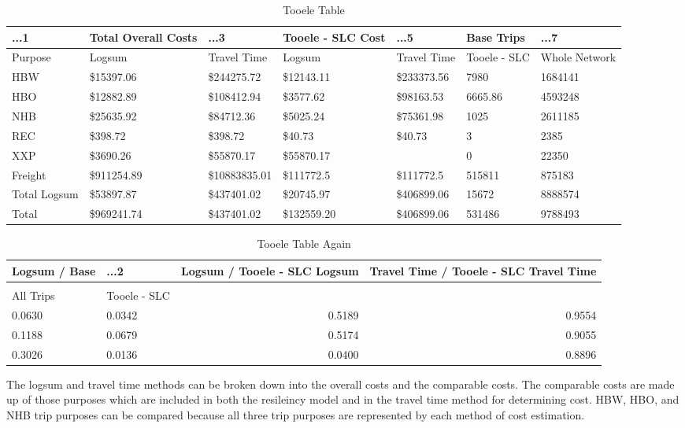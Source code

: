 \begin{table}

\caption{\label{tab:tooeletable}Tooele Table}
\centering
\begin{tabular}[t]{lllllll}
\toprule
...1 & Total Overall Costs & ...3 & Tooele - SLC Cost & ...5 & Base Trips
& ...7\\
\midrule
Purpose & Logsum & Travel Time & Logsum & Travel Time & Tooele - SLC &
Whole Network\\
HBW & \$15397.06 & \$244275.72 & \$12143.11 & \$233373.56 & 7980 & 1684141\\
HBO & \$12882.89 & \$108412.94 & \$3577.62 & \$98163.53 & 6665.86 & 4593248\\
NHB & \$25635.92 & \$84712.36 & \$5025.24 & \$75361.98 & 1025
& 2611185\\
REC & \$398.72 & \$398.72 & \$40.73 & \$40.73 & 3 & 2385\\
\addlinespace
XXP & \$3690.26 & \$55870.17 & \$55870.17 & \- & 0 & 22350\\
Freight & \$911254.89 & \$10883835.01 & \$111772.5 & \$111772.5 & 515811 &
875183\\
Total Logsum & \$53897.87 & \$437401.02 & \$20745.97 & \$406899.06 &
15672 & 8888574\\
Total & \$969241.74 & \$437401.02 & \$132559.20 & \$406899.06 & 531486 & 9788493\\
\bottomrule
\end{tabular}
\end{table}

\begin{table}

\caption{\label{tab:tooeletable2}Tooele Table Again}
\centering
\begin{tabular}[t]{llrr}
\toprule
Logsum / Base & ...2 & Logsum / Tooele - SLC Logsum & Travel Time / Tooele
- SLC Travel Time\\
\midrule
 &  &  & \\
All Trips & Tooele - SLC &  & \\
0.0630 & 0.0342 & 0.5189 & 0.9554\\
0.1188 & 0.0679 & 0.5174 & 0.9055\\
0.3026 & 0.0136 & 0.0400 & 0.8896\\
\bottomrule
\end{tabular}
\end{table}

The logsum and travel time methods can be broken down into the overall costs and the
comparable costs. The comparable costs are made up of those purposes which are
included in both the resileincy model and in the travel time method for determining
cost. HBW, HBO, and NHB trip purposes can be compared because all three trip purposes
are represented by each method of cost estimation.

